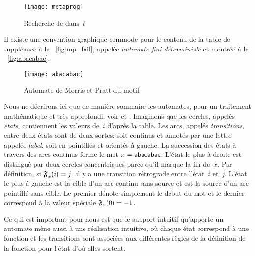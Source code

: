 %
\setlength{\intextsep}{0pt}
\begin{wrapfigure}[30]{r}[0pt]{0pt}
\centering
\texttt{[image: metaprog]}
\caption{Recherche de  dans~\(t\)}%
\label{fig:metaprog}
\end{wrapfigure}
Il existe une convention graphique commode pour le contenu de la table
de suppléance à la \fig~\vref{fig:mp_fail}, appelée \emph{automate
  fini déterministe} et montrée
à la \fig~\vref{fig:abacabac}.
\begin{figure}[b]
\centering
\texttt{[image: abacabac]}
\caption{Automate de Morris et Pratt du motif }
\label{fig:abacabac}
\end{figure}
Nous ne décrirons ici que de manière sommaire les automates; pour un
traitement mathématique et très approfondi, voir
\cite{VanLeeuwen_1990c, HopcroftMotwaniUllman_2003} et
\cite{Sakarovitch_2003}. Imaginons que les cercles, appelés
\emph{états}, contiennent les valeurs de~\(i\) d'après la
table. Les arcs, appelés \emph{transitions}, entre
deux états sont de deux sortes: soit continus et annotés par une
lettre appelée \emph{label}, soit en pointillés et
orientés à gauche. La succession des états à travers des arcs continus
forme le mot \(x=\textsf{abacabac}\). L'état le plus à droite est
distingué par deux cercles concentriques parce qu'il marque la fin
de~\(x\). Par définition, si \(\mathfrak{F}_{x}^{}(i) = j\), il y a une
transition rétrograde entre l'état~\(i\) et~\(j\). L'état le plus à
gauche est la cible d'un arc continu sans source et est la source d'un
arc pointillé sans cible. Le premier dénote simplement le début du mot
et le dernier correspond à la valeur spéciale \(\mathfrak{F}_{x}^{}(0) =
-1\).

Ce qui est important pour nous est que le support intuitif qu'apporte
un automate mène aussi à une réalisation intuitive, où chaque état
correspond à une fonction et les transitions sont associées aux
différentes règles de la définition de la fonction pour l'état d'où
elles sortent.

